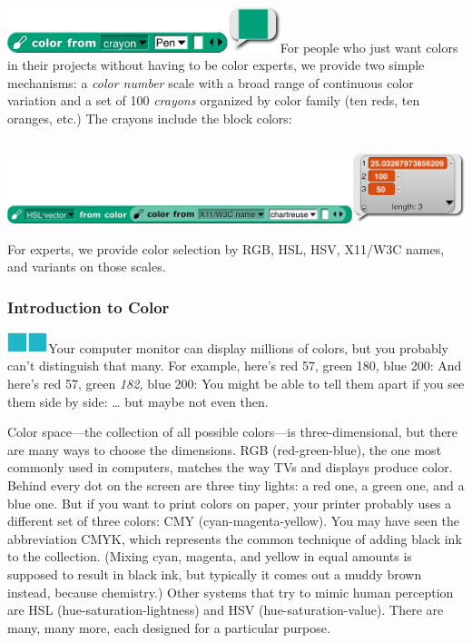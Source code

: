 \includegraphics[width=3.13333in,height=0.51667in]{media/image1135.png}For
people who just want colors in their projects without having to be color
experts, we provide two simple mechanisms: a \emph{color number} scale
with a broad range of continuous color variation and a set of 100
\emph{crayons} organized by color family (ten reds, ten oranges, etc.)
The crayons include the block colors:

\includegraphics[width=7.16667in,height=1.1in]{media/image1136.png}For
experts, we provide color selection by RGB, HSL, HSV, X11/W3C names, and
variants on those scales.

\subsubsection{Introduction to Color}\label{introduction-to-color}

\includegraphics[width=0.23611in,height=0.23611in]{media/image1137.png}\includegraphics[width=0.23611in,height=0.23611in]{media/image1138.png}Your
computer monitor can display millions of colors, but you probably can't
distinguish that many. For example, here's red 57, green 180, blue 200:
And here's red 57, green \emph{182,} blue 200: You might be able to tell
them apart if you see them side by side: \ldots{} but maybe not even
then.

Color space---the collection of all possible colors---is
three-dimensional, but there are many ways to choose the dimensions. RGB
(red-green-blue), the one most commonly used in computers, matches the
way TVs and displays produce color. Behind every dot on the screen are
three tiny lights: a red one, a green one, and a blue one. But if you
want to print colors on paper, your printer probably uses a different
set of three colors: CMY (cyan-magenta-yellow). You may have seen the
abbreviation CMYK, which represents the common technique of adding black
ink to the collection. (Mixing cyan, magenta, and yellow in equal
amounts is supposed to result in black ink, but typically it comes out a
muddy brown instead, because chemistry.) Other systems that try to mimic
human perception are HSL (hue-saturation-lightness) and HSV
(hue-saturation-value). There are many, many more, each designed for a
particular purpose.

